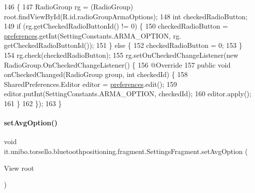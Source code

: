 \begin{DoxyCode}
146                                           \{
147         RadioGroup rg = (RadioGroup) root.findViewById(R.id.radioGroupArmaOptions);
148         \textcolor{keywordtype}{int} checkedRadioButton;
149         \textcolor{keywordflow}{if} (rg.getCheckedRadioButtonId() != 0) \{
150             checkedRadioButton = \hyperlink{classit_1_1unibo_1_1torsello_1_1bluetoothpositioning_1_1fragment_1_1SettingsFragment_a52480c4d5d81ca59fe4a98ae3c623ea4_a52480c4d5d81ca59fe4a98ae3c623ea4}{preferences}.getInt(SettingConstants.ARMA\_OPTION, rg.
      getCheckedRadioButtonId());
151         \} \textcolor{keywordflow}{else} \{
152             checkedRadioButton = 0;
153         \}
154         rg.check(checkedRadioButton);
155         rg.setOnCheckedChangeListener(\textcolor{keyword}{new} RadioGroup.OnCheckedChangeListener() \{
156             @Override
157             \textcolor{keyword}{public} \textcolor{keywordtype}{void} onCheckedChanged(RadioGroup group, \textcolor{keywordtype}{int} checkedId) \{
158                 SharedPreferences.Editor editor = \hyperlink{classit_1_1unibo_1_1torsello_1_1bluetoothpositioning_1_1fragment_1_1SettingsFragment_a52480c4d5d81ca59fe4a98ae3c623ea4_a52480c4d5d81ca59fe4a98ae3c623ea4}{preferences}.edit();
159                 editor.putInt(SettingConstants.ARMA\_OPTION, checkedId);
160                 editor.apply();
161             \}
162         \});
163     \}
\end{DoxyCode}
\hypertarget{classit_1_1unibo_1_1torsello_1_1bluetoothpositioning_1_1fragment_1_1SettingsFragment_a0f26c84f3a3dfffabfed1db04303b8b0_a0f26c84f3a3dfffabfed1db04303b8b0}{}\label{classit_1_1unibo_1_1torsello_1_1bluetoothpositioning_1_1fragment_1_1SettingsFragment_a0f26c84f3a3dfffabfed1db04303b8b0_a0f26c84f3a3dfffabfed1db04303b8b0} 
\paragraph{\texorpdfstring{set\+Avg\+Option()}{setAvgOption()}}
{\footnotesize\ttfamily void it.\+unibo.\+torsello.\+bluetoothpositioning.\+fragment.\+Settings\+Fragment.\+set\+Avg\+Option (\begin{DoxyParamCaption}\item[{View}]{root }\end{DoxyParamCaption})\hspace{0.3cm}{\ttfamily [private]}}



